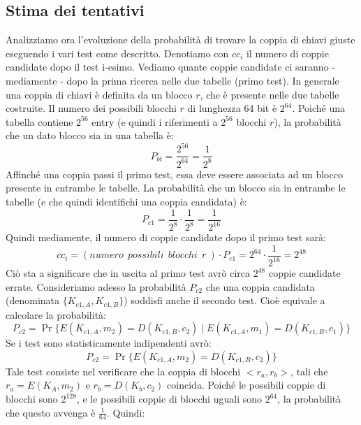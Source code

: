 \subsection{Stima dei tentativi}
Analizziamo ora l'evoluzione della probabilità di trovare la coppia di chiavi giuste eseguendo i vari test come descritto. Denotiamo con $cc_i$ il numero di coppie candidate dopo il test i-esimo. Vediamo quante coppie candidate ci saranno - mediamente - dopo la prima ricerca nelle due tabelle (primo test).
\newline \newline
In generale una coppia di chiavi è definita da un blocco $r$, che è presente nelle due tabelle costruite. Il numero dei possibili blocchi $r$ di lunghezza 64 bit è $2^{64}$. Poiché una tabella contiene $2^{56}$ entry (e quindi i riferimenti a $2^{56}$ blocchi $r$), la probabilità che un dato blocco sia in una tabella è:
\begin{equation}
P_{bt} = \frac{2^{56}}{2^{64}} = \frac{1}{2^8}
\end{equation}
Affinché una coppia passi il primo test, essa deve essere associata ad un blocco presente in entrambe le tabelle. La probabilità che un blocco sia in entrambe le tabelle (e che quindi identifichi una coppia candidata) è:
\begin{equation}
P_{c1} = \frac{1}{2^8} \cdot \frac{1}{2^8} = \frac{1}{2^{16}}
\end{equation}
Quindi mediamente, il numero di coppie candidate dopo il primo test sarà:
\begin{equation}
cc_i = (numero \: \: possibili \: \: blocchi \: \: r \:) \cdot P_{c1} = 2^{64} \cdot \frac{1}{2^{16}} = 2^{48}
\end{equation}
Ciò sta a significare che in uscita al primo test avrò circa $2^{48}$ coppie candidate errate.
\newline \newline
Consideriamo adesso la probabilità $P_{c2}$ che una coppia candidata (denominata $\{ K_{c1,A},K_{c1,B} \}$) soddisfi anche il secondo test. Cioè equivale a calcolare la probabilità:
\begin{equation}
P_{c2} = \Pr\{E(K_{c1,A}, m_{2}) = D(K_{c1,B}, c_{2}) \mid E(K_{c1,A}, m_{1}) = D(K_{c1,B}, c_{1})\}
\end{equation}
Se i test sono statisticamente indipendenti avrò:
\begin{equation}
P_{c2} = \Pr\{E(K_{c1,A}, m_{2}) = D(K_{c1,B}, c_{2})\}
\end{equation}
Tale test consiste nel verificare che la coppia di blocchi $<r_a,r_b>$, tali che $r_a = E(K_{A}, m_{2})$ e $r_b = D(K_{b}, c_{2})$ coincida. Poiché le possibili coppie di blocchi sono $2^128$, e le possibili coppie di blocchi uguali sono $2^64$, la probabilità che questo avvenga è $\frac{1}{64}$. Quindi:
